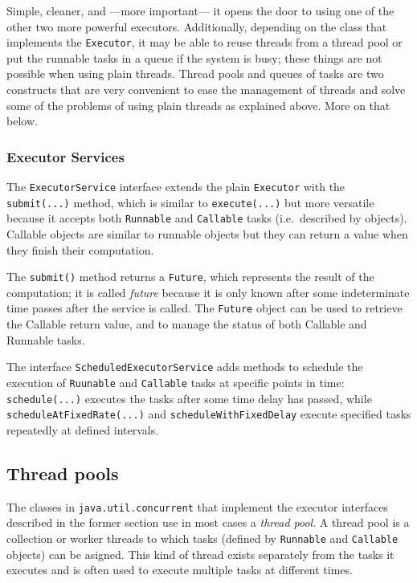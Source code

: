 Simple, cleaner, and ---more important--- it opens the door to using
one of the other two more powerful executors. Additionally, depending
on the class that implements the \verb+Executor+, it may be able to
reuse threads from a thread pool or put the runnable tasks in a queue
if the system is busy; these things are not possible when using plain
threads. Thread pools and queues of tasks are two constructs that
are very convenient to ease the management of threads and solve some
of the problems of using plain threads as explained above. More on
that below. 

\subsubsection{Executor Services}
\label{sec:executor-services}

The \verb+ExecutorService+ interface extends the plain \verb+Executor+
with the \verb+submit(...)+ method, which is similar to
\verb+execute(...)+ but more versatile because it accepts both
\verb+Runnable+ and \verb+Callable+ tasks (i.e.~described by
objects). Callable objects are similar to runnable objects but they
can return a value when they finish their computation. 

The \verb+submit()+ method returns a \verb+Future+, which represents
the result of the computation; it is called \emph{future} because it
is only known after some indeterminate time passes after the service
is called. The \verb+Future+ object can be used to retrieve the
Callable return value, and to manage the status of both Callable and
Runnable tasks. 


The interface \verb+ScheduledExecutorService+ adds methods to schedule
the execution of \verb+Ruunable+ and \verb+Callable+ tasks at specific
points in time: \verb+schedule(...)+ executes the tasks after some
time delay has passed, while \verb+scheduleAtFixedRate(...)+ and
\verb+scheduleWithFixedDelay+ execute specified tasks repeatedly at 
defined intervals. 


\subsection{Thread pools}
\label{sec:thread-pools}

The classes in \verb+java.util.concurrent+ that implement the executor
interfaces described in the former section use in most cases a
\emph{thread pool}. A thread pool is a collection or worker threads
to which tasks (defined by \verb+Runnable+ and \verb+Callable+
objects) can be asigned. This kind of thread exists separately from
the tasks it executes and is often used to execute multiple tasks at
different times. 

